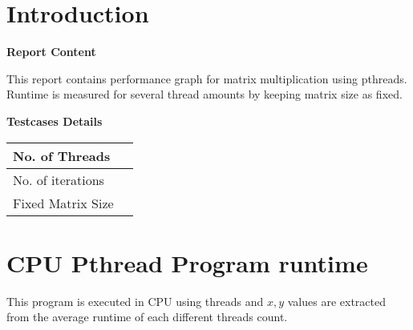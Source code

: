 \documentclass[12pt, a4paper]{article}
\title{\titlefont{Pthread Matrix Multiplication Runtime}}
\author{M.A.S SURANGA (CST140043)}
\date{}
\begin{document}
	\maketitle

	\vspace*{5\baselineskip} 
	\begin{center}
	\end{center}

	\newpage
	\setlength{\cftbeforesecskip}{6pt}
	\tableofcontents

	\newpage
	\section{Introduction}
	\hfill \break

	\textbf{Report Content}

	\hfill \break

	This report contains performance graph for matrix multiplication using pthreads. Runtime is measured for several thread amounts by keeping matrix size as fixed.  

	\hfill \break

	\textbf{Testcases Details}

	\hfill \break


	\begin{tabu} to 1 \textwidth { | X[l] | X[r] | }
		 \hline
		 No. of Threads &   \\
		 \hline
		 No. of iterations &   \\
		 \hline
		 Fixed Matrix Size &   \\
		 \hline
	\end{tabu}	
	

	\newpage

	\section{CPU Pthread Program runtime}

	\par
	This program is executed in CPU using threads and $x,y$ values are extracted from the average runtime of each different threads count.
	\hfill \break

\end{document}
